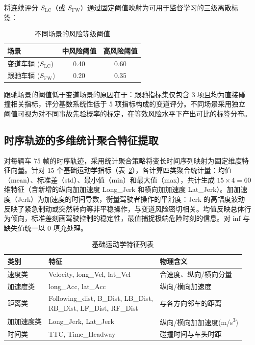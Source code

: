 \documentclass[preprint,review,12pt,a4paper]{elsarticle}
\begin{document}
将连续评分 $S_{\text{LC}}$（或 $S_{\text{FW}}$）通过固定阈值映射为可用于监督学习的三级离散标签：

\begin{table}[H]
\centering
\caption{不同场景的风险等级阈值}
\label{tab:risk_thresholds}
\small
\begin{tabular}{lcc}
\toprule
场景 & 中风险阈值 & 高风险阈值 \\
\midrule
变道车辆 ($S_{\text{LC}}$) & 0.40 & 0.60 \\
跟驰车辆 ($S_{\text{FW}}$) & 0.20 & 0.35 \\
\bottomrule
\end{tabular}
\end{table}

跟驰场景的阈值低于变道场景的原因在于：跟驰指标集仅包含 3 项且均为直接碰撞相关指标，评分基数系统性低于 5 项指标构成的变道评分。不同场景采用独立阈值可视为对不同事故先验概率的标定，在等效风险水平下产出可比的标签分布。

\subsection{时序轨迹的多维统计聚合特征提取}

对每辆车 75 帧的时序轨迹，采用统计聚合策略将变长时间序列映射为固定维度特征向量。针对 15 个基础运动学指标（表~\ref{tab:features}），各计算四类聚合统计量：均值（mean）、标准差（std）、最小值（min）和最大值（max），共计生成 $15 \times 4 = 60$ 维特征（含新增的纵向加加速度 Long\_Jerk 和横向加加速度 Lat\_Jerk）。加加速度（Jerk）为加速度的时间导数，衡量驾驶者操作的平滑度：Jerk 的高幅度波动反映了紧急制动或突然转向等非平稳操作，与变道风险密切相关。均值反映总体行为倾向，标准差刻画驾驶控制的稳定性，最值捕捉极端危险时刻的信息。对 inf 与缺失值统一以 0 填充处理。

\begin{table}[H]
\centering
\caption{基础运动学特征列表}
\label{tab:features}
\small
\begin{tabular}{llp{6cm}}
\toprule
类别 & 特征 & 物理含义 \\
\midrule
速度类 & Velocity, long\_Vel, lat\_Vel & 合速度、纵向/横向分量 \\
加速度类 & long\_Acc, lat\_Acc & 纵向/横向加速度 \\
距离类 & \makecell[l]{Following\_dist, B\_Dist, LB\_Dist, \\ RB\_Dist, LF\_Dist, RF\_Dist} & 与各方向邻车的距离 \\
加加速度类 & Long\_Jerk, Lat\_Jerk & 纵向/横向加加速度(m/s\textsuperscript{3}) \\
时间类 & TTC, Time\_Headway & 碰撞时间与车头时距 \\
\bottomrule
\end{tabular}
\end{table}
\end{document}
